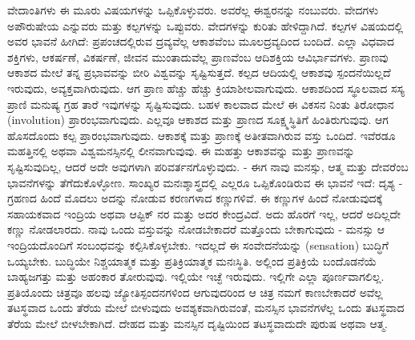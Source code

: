 ವೇದಾಂತಿಗಳು ಈ ಮೂರು ವಿಷಯಗಳನ್ನು ಒಪ್ಪಿಕೊಳ್ಳುವರು. ಅವರೆಲ್ಲ ಈಶ್ವರನನ್ನು ನಂಬುವರು. ವೇದಗಳು ಅಪೌರುಷೇಯ ಎನ್ನುವರು ಮತ್ತು ಕಲ್ಪಗಳನ್ನು ಒಪ್ಪುವರು. ವೇದಗಳನ್ನು ಕುರಿತು ಹೇಳಿದ್ದಾಗಿದೆ. ಕಲ್ಪಗಳ ವಿಷಯದಲ್ಲಿ ಅವರ ಭಾವನೆ ಹೀಗಿದೆ: ಪ್ರಪಂಚದಲ್ಲಿರುವ ದ್ರವ್ಯವೆಲ್ಲ ಆಕಾಶವೆಂಬ ಮೂಲದ್ರವ್ಯದಿಂದ ಬಂದಿದೆ. ಎಲ್ಲಾ ವಿಧವಾದ ಶಕ್ತಿಗಳು, ಆಕರ್ಷಣೆ, ವಿಕರ್ಷಣೆ, ಜೀವನ ಮುಂತಾದುವೆಲ್ಲ ಪ್ರಾಣವೆಂಬ ಆದಿಶಕ್ತಿಯ ಆವಿರ್ಭಾವಗಳು. ಪ್ರಾಣವು ಆಕಾಶದ ಮೇಲೆ ತನ್ನ ಪ್ರಭಾವವನ್ನು ಬೀರಿ ವಿಶ್ವವನ್ನು ಸೃಷ್ಟಿಸುತ್ತದೆ. ಕಲ್ಪದ ಆದಿಯಲ್ಲಿ ಆಕಾಶವು ಸ್ಪಂದನೆಯಿಲ್ಲದೆ ಇರುವುದು, ಅವ್ಯಕ್ತವಾಗಿರುವುದು. ಆಗ ಪ್ರಾಣ ಹೆಚ್ಚು ಹೆಚ್ಚು ಕ್ರಿಯಾಶೀಲವಾಗುವುದು. ಆಕಾಶದಿಂದ ಸ್ಥೂಲವಾದ ಸಸ್ಯ ಪ್ರಾಣಿ ಮನುಷ್ಯ ಗ್ರಹ ತಾರೆ ಇವುಗಳನ್ನು ಸೃಷ್ಟಿಸುವುದು. ಬಹಳ ಕಾಲವಾದ ಮೇಲೆ ಈ ವಿಕಸನ ನಿಂತು ತಿರೋಧಾನ (involution) ಪ್ರಾರಂಭವಾಗುವುದು. ಎಲ್ಲವೂ ಆಕಾಶದ ಮತ್ತು ಪ್ರಾಣದ ಸೂಕ್ಷ್ಮಸ್ಥಿತಿಗೆ ಹಿಂತಿರುಗುವುವು. ಆಗ ಹೊಸದೊಂದು ಕಲ್ಪ ಪ್ರಾರಂಭವಾಗುವುದು. ಆಕಾಶಕ್ಕೆ ಮತ್ತು ಪ್ರಾಣಕ್ಕೆ ಅತೀತವಾಗಿರುವ ವಸ್ತು ಒಂದಿದೆ. ಇವೆರಡೂ ಮಹತ್ತಿನಲ್ಲಿ ಅಥವಾ ವಿಶ್ವಮನಸ್ಸಿನಲ್ಲಿ ಲೀನವಾಗುವುವು. ಈ ಮಹತ್ತು ಆಕಾಶವನ್ನು ಮತ್ತು ಪ್ರಾಣವನ್ನು ಸೃಷ್ಟಿಸುವುದಿಲ್ಲ, ಆದರೆ ಅದೇ ಅವುಗಳಾಗಿ ಪರಿವರ್ತನಗೊಳ್ಳುವುದು. - ಈಗ ನಾವು ಮನಸ್ಸು, ಆತ್ಮ ಮತ್ತು ದೇವರೆಂಬ ಭಾವನೆಗಳನ್ನು ತೆಗೆದುಕೊಳ್ಳೋಣ. ಸಾಂಖ್ಯರ ಮನಃಶ್ಶಾಸ್ತ್ರದಲ್ಲಿ ಎಲ್ಲರೂ ಒಪ್ಪಿಕೊಂಡಿರುವ ಈ ಭಾವನೆ ಇದೆ: ದೃಶ್ಯ - ಗ್ರಹಣದ ಹಿಂದೆ ಮೊದಲು ಅದನ್ನು ನೋಡುವ ಕರಣಗಳಾದ ಕಣ್ಣುಗಳಿವೆ. ಈ ಕಣ್ಣುಗಳ ಹಿಂದೆ ನೋಡುವುದಕ್ಕೆ ಸಹಾಯಕವಾದ ಇಂದ್ರಿಯ ಅಥವಾ ಆಪ್ಟಿಕ್ ನರ ಮತ್ತು ಅದರ ಕೇಂದ್ರವಿದೆ. ಅದು ಹೊರಗೆ ಇಲ್ಲ, ಆದರೆ ಅದಿಲ್ಲದೇ ಕಣ್ಣು ನೋಡಲಾರದು. ನಾವು ಒಂದು ವಸ್ತುವನ್ನು ನೋಡಬೇಕಾದರೆ ಮತ್ತೊಂದು ಬೇಕಾಗುವುದು - ಮನಸ್ಸು ಆ ಇಂದ್ರಿಯದೊಂದಿಗೆ ಸಂಬಂಧವನ್ನು ಕಲ್ಪಿಸಿಕೊಳ್ಳಬೇಕು. ಇದಲ್ಲದೆ ಈ ಸಂವೇದನೆಯನ್ನು (sensation) ಬುದ್ಧಿಗೆ ಒಯ್ಯಬೇಕು. ಬುದ್ಧಿಯೇ ನಿಶ್ಚಯಾತ್ಮಕ ಮತ್ತು ಪ್ರತಿಕ್ರಿಯಾತ್ಮಕ ಮನಃಸ್ಥಿತಿ. ಅಲ್ಲಿಂದ ಪ್ರತಿಕ್ರಿಯೆ ಬಂದೊಡನೆಯೆ ಬಾಹ್ಯಜಗತ್ತು ಮತ್ತು ಅಹಂಕಾರ ತೋರುವುವು. ಇಲ್ಲಿಯೇ ಇಚ್ಛೆ ಇರುವುದು. ಇಲ್ಲಿಗೇ ಎಲ್ಲಾ ಪೂರ್ಣವಾಗಲಿಲ್ಲ. ಪ್ರತಿಯೊಂದು ಚಿತ್ರವೂ ಹಲವು ಜ್ಯೋತಿಸ್ಪಂದನಗಳಿಂದ ಆಗುವುದರಿಂದ ಆ ಚಿತ್ರ ನಮಗೆ ಕಾಣಬೇಕಾದರೆ ಅವೆಲ್ಲ ತಟಸ್ಥವಾದ ಒಂದು ತೆರೆಯ ಮೇಲೆ ಬೀಳುವುದು ಅವಶ್ಯಕವಾಗಿರುವಂತೆ, ಮನಸ್ಸಿನ ಭಾವನೆಗಳೆಲ್ಲ ಒಂದು ತಟಸ್ಥವಾದ ತೆರೆಯ ಮೇಲೆ ಬೀಳಬೇಕಾಗಿದೆ. ದೇಹದ ಮತ್ತು ಮನಸ್ಸಿನ ದೃಷ್ಟಿಯಿಂದ ತಟಸ್ಥವಾದುದೇ ಪುರುಷ ಅಥವಾ ಆತ್ಮ.

